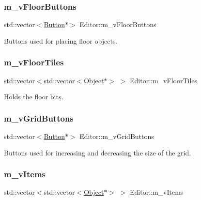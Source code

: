 \subsubsection{\texorpdfstring{m\+\_\+v\+Floor\+Buttons}{m\_vFloorButtons}}
{\footnotesize\ttfamily std\+::vector$<$\hyperlink{class_button}{Button}$\ast$$>$ Editor\+::m\+\_\+v\+Floor\+Buttons\hspace{0.3cm}{\ttfamily [private]}}



Buttons used for placing floor objects. 

\mbox{\label{class_editor_aceefb538ec2410d4cd776bd032267c07}} 
\subsubsection{\texorpdfstring{m\+\_\+v\+Floor\+Tiles}{m\_vFloorTiles}}
{\footnotesize\ttfamily std\+::vector$<$std\+::vector$<$\hyperlink{class_object}{Object}$\ast$$>$ $>$ Editor\+::m\+\_\+v\+Floor\+Tiles\hspace{0.3cm}{\ttfamily [private]}}



Holds the floor bits. 

\mbox{\label{class_editor_ac0d079d35dfb8f4e4c1541ace24e7950}} 
\subsubsection{\texorpdfstring{m\+\_\+v\+Grid\+Buttons}{m\_vGridButtons}}
{\footnotesize\ttfamily std\+::vector$<$\hyperlink{class_button}{Button}$\ast$$>$ Editor\+::m\+\_\+v\+Grid\+Buttons\hspace{0.3cm}{\ttfamily [private]}}



Buttons used for increasing and decreasing the size of the grid. 

\mbox{\label{class_editor_a09f6db89db3bb550d9f2a1ae2338fb66}} 
\subsubsection{\texorpdfstring{m\+\_\+v\+Items}{m\_vItems}}
{\footnotesize\ttfamily std\+::vector$<$std\+::vector$<$\hyperlink{class_object}{Object}$\ast$$>$ $>$ Editor\+::m\+\_\+v\+Items\hspace{0.3cm}{\ttfamily [private]}}



